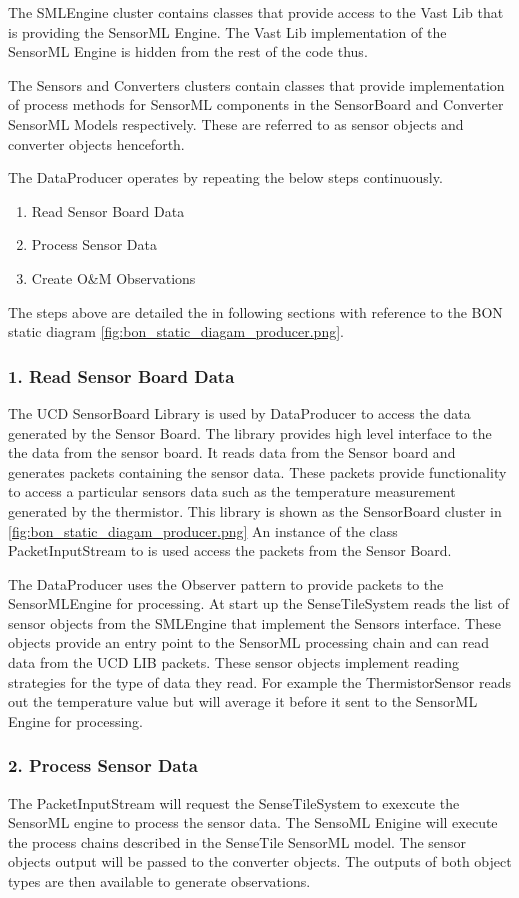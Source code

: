 \documentclass[]{final_report}
\begin{document}
The SMLEngine cluster contains classes that provide access to
the Vast Lib that is providing the SensorML Engine.  The Vast Lib implementation
of the SensorML Engine is hidden from the rest of the code thus.

The Sensors and Converters clusters contain classes that provide
implementation of process methods for SensorML components in the SensorBoard and
Converter SensorML Models respectively. These are referred to as sensor objects and
converter objects henceforth.

The DataProducer operates by repeating the below steps continuously.
 \begin{enumerate}
\item Read Sensor Board Data
\item Process Sensor Data
\item Create O\&M Observations
\end{enumerate}
The steps above are detailed the in following sections with reference
to the BON static diagram \ref{fig:bon_static_diagam_producer.png}.

\subsubsection {1. Read Sensor Board Data}

The UCD SensorBoard Library is used by DataProducer to access
the data generated by the Sensor Board.
The library provides high level interface to the
the data from the sensor board. It reads data from the Sensor board and generates packets
containing the sensor data. These packets provide functionality
to access a particular sensors data such as the temperature
measurement generated by the thermistor. 
This library is shown as the SensorBoard cluster in \ref{fig:bon_static_diagam_producer.png}
An instance of the class PacketInputStream to is used access the packets from the Sensor Board.

The DataProducer uses the Observer pattern to provide
packets to the SensorMLEngine for processing.
At start up the SenseTileSystem reads the list of sensor objects from the SMLEngine that
implement the Sensors interface. These objects provide an entry point
to the SensorML processing chain and can read data from the UCD LIB packets.
These sensor objects implement reading strategies for the type of data they read. 
For example the ThermistorSensor reads out the temperature value
but will average it before it sent to the SensorML Engine for processing.

\subsubsection {2. Process Sensor Data}
The PacketInputStream will request the SenseTileSystem to exexcute
the SensorML engine to process the sensor data. The SensoML Enigine
will execute the process chains described in the SenseTile SensorML model.
The sensor objects output will be passed to the converter objects. The
outputs of both object types are then available to generate observations.
\end{document}
